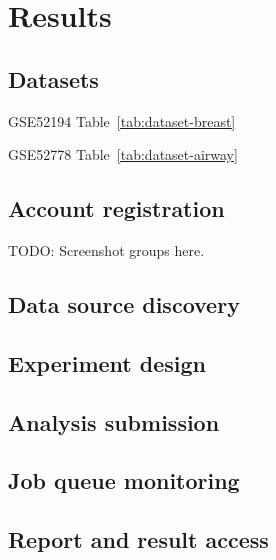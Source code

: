 \chapter{Results}
\label{c:result}

\section{Datasets}

%

GSE52194 \cite{eswaran2012:transcriptomic}
Table~\ref{tab:dataset-breast}





GSE52778 \cite{himes2014:rnaseq}
Table~\ref{tab:dataset-airway}




\section{Account registration}

TODO: Screenshot groups here.

\section{Data source discovery}


\section{Experiment design}


\section{Analysis submission}


\section{Job queue monitoring}


\section{Report and result access}

